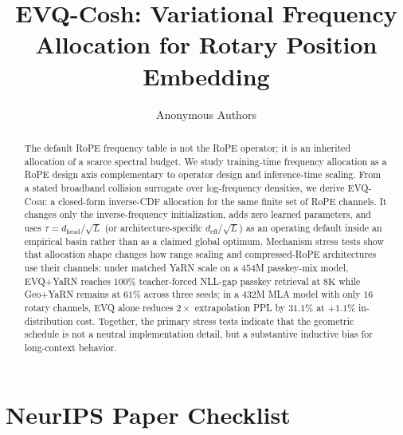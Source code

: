 \documentclass{article}
\title{EVQ-Cosh: Variational Frequency Allocation for Rotary Position Embedding}
\author{Anonymous Authors}
\begin{document}
\maketitle

\begin{abstract}
The default RoPE frequency table is not the RoPE operator; it is an inherited allocation of a scarce spectral budget. We study training-time frequency allocation as a RoPE design axis complementary to operator design and inference-time scaling. From a stated broadband collision surrogate over log-frequency densities, we derive \textsc{EVQ-Cosh}: a closed-form inverse-CDF allocation for the same finite set of RoPE channels. It changes only the inverse-frequency initialization, adds zero learned parameters, and uses $\tau=d_{\mathrm{head}}/\sqrt{L}$ (or architecture-specific $d_{\mathrm{eff}}/\sqrt{L}$) as an operating default inside an empirical basin rather than as a claimed global optimum. Mechanism stress tests show that allocation shape changes how range scaling and compressed-RoPE architectures use their channels: under matched YaRN scale on a $454$M passkey-mix model, EVQ+YaRN reaches $100\%$ teacher-forced NLL-gap passkey retrieval at $8\mathrm{K}$ while Geo+YaRN remains at $61\%$ across three seeds; in a $432$M MLA model with only $16$ rotary channels, EVQ alone reduces $2\times$ extrapolation PPL by $31.1\%$ at $+1.1\%$ in-distribution cost. Together, the primary stress tests indicate that the geometric schedule is not a neutral implementation detail, but a substantive inductive bias for long-context behavior.
\end{abstract}







\newpage



\clearpage
\appendix






\clearpage
\section*{NeurIPS Paper Checklist}
\end{document}
